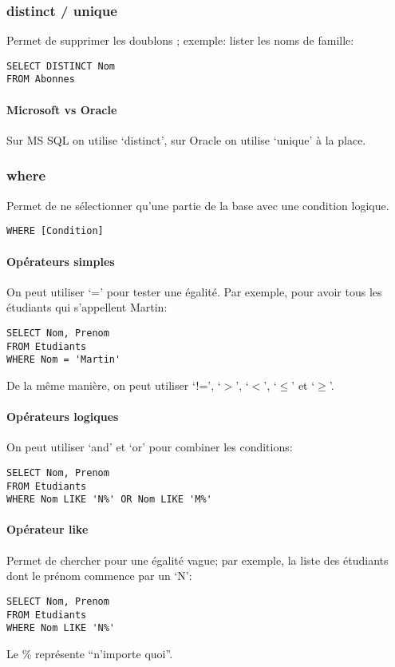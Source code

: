 \documentclass[10pt,a4paper,french]{article}
\begin{document}
\subsubsection{\gls{distinct} / \gls{unique}}

Permet de supprimer les doublons ; exemple: lister les noms de famille:
\begin{verbatim}
SELECT DISTINCT Nom
FROM Abonnes
\end{verbatim}

\paragraph{Microsoft vs Oracle}
Sur MS SQL on utilise `\gls{distinct}', sur Oracle on utilise `\gls{unique}' à la place.

\subsubsection{\gls{where}}\label{where}

Permet de ne sélectionner qu'une partie de la base avec une condition logique.
\begin{verbatim}
WHERE [Condition]
\end{verbatim}

\paragraph{Opérateurs simples}
On peut utiliser `=' pour tester une égalité. Par exemple, pour avoir tous les étudiants qui s'appellent Martin:
\begin{verbatim}
SELECT Nom, Prenom
FROM Etudiants
WHERE Nom = 'Martin'
\end{verbatim}
De la même manière, on peut utiliser `!=', `$>$', `$<$', `$\leq$' et `$\geq$'.

\paragraph{Opérateurs logiques}
On peut utiliser `\gls{and}' et `\gls{or}' pour combiner les conditions:
\begin{verbatim}
SELECT Nom, Prenom
FROM Etudiants
WHERE Nom LIKE 'N%' OR Nom LIKE 'M%'
\end{verbatim}

\paragraph{Opérateur \gls{like}}
Permet de chercher pour une égalité vague; par exemple, la liste des étudiants dont le prénom commence par un `N':
\begin{verbatim}
SELECT Nom, Prenom
FROM Etudiants
WHERE Nom LIKE 'N%'
\end{verbatim}
Le \% représente ``n'importe quoi''.
\end{document}
